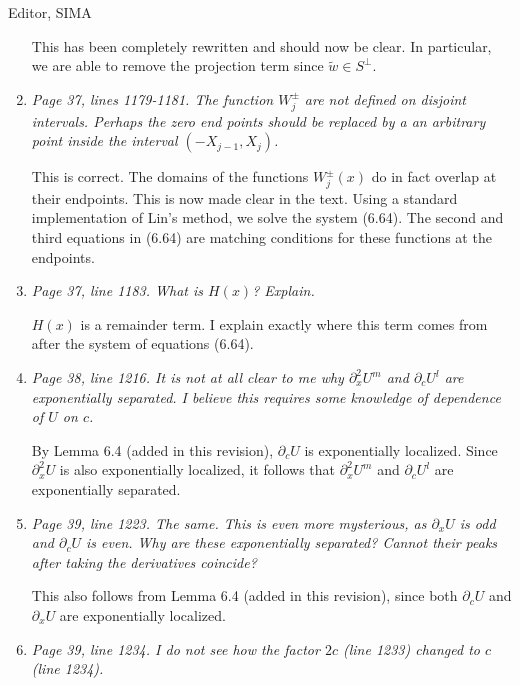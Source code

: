 \documentclass[11pt]{letter}
\begin{document}
\begin{letter}{Editor, SIMA}
\begin{enumerate}
This has been completely rewritten and should now be clear. In particular, we are able to remove the projection term since $\tilde{w} \in S^\perp$.

\item \emph{Page 37, lines 1179-1181. The function $W_j^\pm$ are not defined on disjoint intervals. Perhaps the zero end points should be replaced by a an arbitrary point inside the interval $(-X_{j-1},X_j)$.}
\vspace{4mm}

This is correct. The domains of the functions $W_j^\pm(x)$ do in fact overlap at their endpoints. This is now made clear in the text. Using a standard implementation of Lin's method, we solve the system (6.64). The second and third equations in (6.64) are matching conditions for these functions at the endpoints.

\item \emph{Page 37, line 1183. What is $H(x)$? Explain.}
\vspace{4mm}

$H(x)$ is a remainder term. I explain exactly where this term comes from after the system of equations (6.64).

\item \emph{Page 38, line 1216. It is not at all clear to me why $\partial_x^2 U^m$ and $\partial_c U^l$ are exponentially separated. I believe this requires some knowledge of dependence of $U$ on $c$.}
\vspace{4mm}

By Lemma 6.4 (added in this revision), $\partial_c U$ is exponentially localized. Since $\partial_x^2 U$ is also exponentially localized, it follows that $\partial_x^2 U^m$ and $\partial_c U^l$ are exponentially separated.

\item \emph{Page 39, line 1223. The same. This is even more mysterious, as $\partial_x U$ is odd and $\partial_c U$ is even. Why are these exponentially separated? Cannot their peaks after taking the derivatives coincide?}
\vspace{4mm}

This also follows from Lemma 6.4 (added in this revision), since both $\partial_c U$ and $\partial_x U$ are exponentially localized.

\item \emph{Page 39, line 1234. I do not see how the factor $2c$ (line 1233) changed to $c$ (line 1234).}
\vspace{4mm}


\end{enumerate}
\end{letter}
\end{document}

